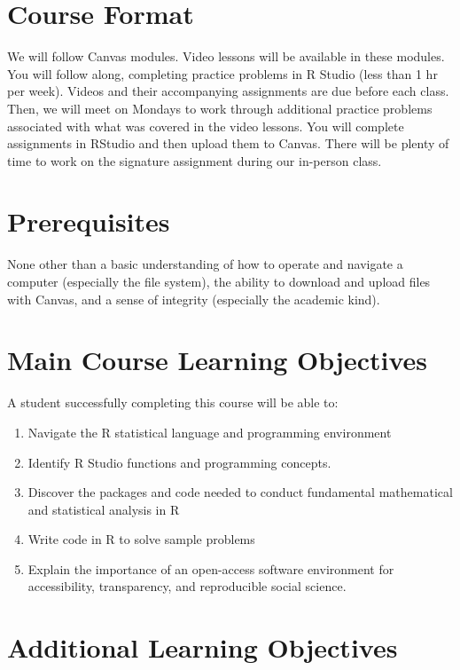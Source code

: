 \documentclass[
  12pt,
]{scrreprt}
\begin{document}
\section{Course Format}\label{course-format}

We will follow Canvas modules. Video lessons will be available in these
modules. You will follow along, completing practice problems in R Studio
(less than 1 hr per week). Videos and their accompanying assignments are
due before each class. Then, we will meet on Mondays to work through
additional practice problems associated with what was covered in the
video lessons. You will complete assignments in RStudio and then upload
them to Canvas. There will be plenty of time to work on the signature
assignment during our in-person class.

\section{Prerequisites}\label{prerequisites}

None other than a basic understanding of how to operate and navigate a
computer (especially the file system), the ability to download and
upload files with Canvas, and a sense of integrity (especially the
academic kind).

\section{Main Course Learning
Objectives}\label{main-course-learning-objectives}

A student successfully completing this course will be able to:

\begin{enumerate}
\def\labelenumi{\arabic{enumi}.}
\item
  Navigate the R statistical language and programming environment
\item
  Identify R Studio functions and programming concepts.
\item
  Discover the packages and code needed to conduct fundamental
  mathematical and statistical analysis in R
\item
  Write code in R to solve sample problems
\item
  Explain the importance of an open-access software environment for
  accessibility, transparency, and reproducible social science.
\end{enumerate}

\section{Additional Learning
Objectives}\label{additional-learning-objectives}
\end{document}
